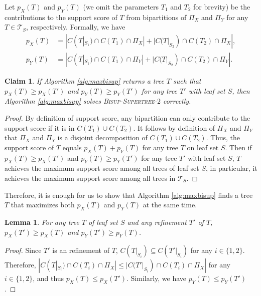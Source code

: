 \documentclass{bmcart}
\newcommand{\bisuptwo}{\textsc{Bisup-Supertree-$2$}\xspace}
\newtheorem{lemma}{Lemma}
\newtheorem{claim}{Claim}
\begin{document}
Let $p_X(T)$ and $p_Y(T)$ (we omit the parameters $T_1$ and $T_2$ for brevity) be the contributions to the support score of $T$ from bipartitions of $\Pi_X$ and $\Pi_Y$ for any $T \in \mathcal{T}_S$, respectively. Formally, we have 
\begin{align*}
    p_X(T) &= |C(T|_{S_1}) \cap C(T_1) \cap \Pi_X| + |C(T|_{S_2}) \cap C(T_2) \cap \Pi_X|,\\
    p_Y(T) &= |C(T|_{S_1}) \cap C(T_1) \cap \Pi_Y| + |C(T|_{S_2}) \cap C(T_2) \cap \Pi_Y|.
\end{align*}

\begin{claim} \label{claim:sum_score_solves_prob}
    If Algorithm \ref{alg:maxbisup} returns a tree $T$ such that $p_X(T) \ge p_X(T')$ and $p_Y(T) \ge p_Y(T')$ for any tree $T'$ with leaf set $S$, then Algorithm \ref{alg:maxbisup} solves \bisuptwo correctly.
\end{claim}
\begin{proof}
By definition of support score, any bipartition can only contribute to the support score if it is in $C(T_1) \cup C(T_2)$. It follows by definition of $\Pi_X$ and $\Pi_Y$ that $\Pi_X$ and $\Pi_Y$ is a disjoint decomposition of $C(T_1) \cup C(T_2)$. Thus, the support score of $T$ equals $p_X(T) + p_Y(T)$ for any tree $T$ on leaf set $S$. Then if $p_X(T) \ge p_X(T')$ and $p_Y(T) \ge p_Y(T')$ for any tree $T'$ with leaf set $S$, $T$ achieves the maximum support score among all trees of leaf set $S$, in particular, it achieves the maximum support score among all trees in $\mathcal{T}_S$.
\end{proof}
Therefore, it is enough for us to show that Algorithm \ref{alg:maxbisup} finds a tree $T$ that maximizes both $p_X(T)$ and $p_Y(T)$ at the same time.


\begin{lemma}\label{lem:refine_only_increases}
    For any tree $T$ of leaf set $S$ and any refinement $T'$ of $T$, $p_X(T')\ge p_X(T)$ and $p_Y(T') \ge p_Y(T)$.
\end{lemma}
\begin{proof}
    Since $T'$ is an refinement of $T$, $C(T|_{S_i}) \subseteq C(T'|_{S_i})$ for any $i \in \{1,2\}$. Therefore, $|C(T|_{S_i}) \cap C(T_i) \cap \Pi_X| \le |C(T'|_{S_i}) \cap C(T_i) \cap \Pi_X|$ for any $i \in \{1,2\}$, and thus $p_X(T) \le p_X(T')$. Similarly, we have $p_Y(T) \le p_Y(T')$.
\end{proof}
\end{document}

